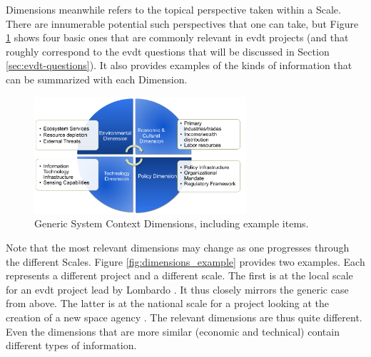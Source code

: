 Dimensions meanwhile refers to the topical perspective taken within a Scale. There are innumerable potential such perspectives that one can take, but Figure \ref{fig:dimensions_generic} shows four basic ones that are commonly relevant in \ac{evdt} projects (and that roughly correspond to the \ac{evdt} questions that will be discussed in Section \ref{sec:evdt-questions}). It also provides examples of the kinds of information that can be summarized with each Dimension.

\begin{figure}[!htb] 
\centering
\includegraphics[width=0.7\textwidth]{Figures/chap3/dimensions_generic.png}
\caption[Generic System Context Dimensions]{Generic System Context Dimensions, including example items.}
\label{fig:dimensions_generic}
\end{figure}

Note that the most relevant dimensions may change as one progresses through the different Scales. Figure \ref{fig:dimensions_example} provides two examples. Each represents a different project and a different scale. The first is at the local scale for an \ac{evdt} project lead by Lombardo \cite{lombardoDevelopmentDecisionSupport2021, lombardoUtilizingSatelliteEarth2022}. It thus closely mirrors the generic case from above. The latter is at the national scale for a project looking at the creation of a new space agency \cite{woodBuildingTechnologicalCapability2012}. The relevant dimensions are thus quite different. Even the dimensions that are more similar (economic and technical) contain different types of information.

